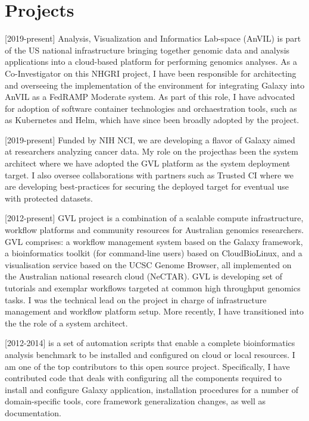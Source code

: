\documentclass{article}
\begin{document}
    
%
%

\vspace{\parskip}
\section{Projects}

[2019-present]
Analysis, Visualization and Informatics Lab-space (AnVIL) is part of the US national infrastructure bringing together genomic data and analysis applications into a cloud-based platform for performing genomics analyses. As a Co-Investigator on this NHGRI project, I have been responsible for architecting and overseeing the implementation of the environment for integrating Galaxy into AnVIL as a FedRAMP Moderate system. As part of this role, I have advocated for adoption of software container technologies and orchaestration tools, such as as Kubernetes and Helm, which have since been broadly adopted by the project.

[2019-present]
Funded by NIH NCI, we are developing a flavor of Galaxy aimed at researchers analyzing cancer data. My role on the projecthas been the system architect where we have adopted the GVL platform as the system deployment target. I also oversee collaborations with partners such as Trusted CI where we are developing best-practices for securing the deployed target for eventual use with protected datasets.

[2012-present]
GVL project is a combination of a scalable compute infrastructure, workflow platforms and community resources for Australian genomics researchers. GVL comprises: a workflow management system based on the Galaxy framework, a bioinformatics toolkit (for command-line users) based on CloudBioLinux, and a visualisation service based on the UCSC Genome Browser, all implemented on the Australian national research cloud (NeCTAR). GVL is developing set of tutorials and exemplar workflows targeted at common high throughput genomics tasks. I was the technical lead on the project in charge of infrastructure management and workflow platform setup. More recently, I have transitioned into the the role of a system architect.

[2012-2014]
is a set of automation scripts that enable a complete bioinformatics analysis benchmark to be installed and configured on cloud or local resources. I am one of the top contributors to this open source project. Specifically, I have contributed code that deals with configuring all the components required to install and configure Galaxy application, installation procedures for a number of domain-specific tools, core framework generalization changes, as well as documentation.
\end{document}
